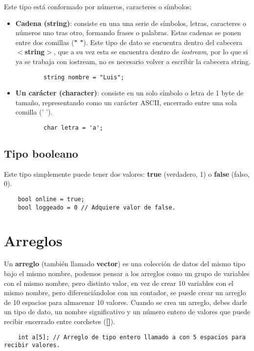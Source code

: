Este tipo está conformado por números, caracteres o símbolos:
\begin{itemize}
    \item \textbf{Cadena (string)}: consiste en una una serie de símbolos, letras, caracteres o números uno tras otro, formando frases o palabras. Estas cadenas se ponen entre dos comillas (\textbf{" "}). Este tipo de dato se encuentra dentro del cabecera \textbf{$<$string$>$}, que a su vez esta se encuentra dentro de \textit{iostream}, por lo que si ya se trabaja con iostream, no es necesario volver a escribir la cabecera string.
    \begin{lstlisting}
        string nombre = "Luis";
    \end{lstlisting}
    \item \textbf{Un carácter (character)}: consiste en un solo símbolo o letra de 1 byte de tamaño, representando como un carácter ASCII, encerrado entre una sola comilla (' ').
    \begin{lstlisting}
        char letra = 'a';
    \end{lstlisting}
\end{itemize}


\subsection{Tipo booleano}

Este tipo simplemente puede tener dos valores: \textbf{true} (verdadero, 1) o \textbf{false} (falso, 0).
\begin{lstlisting}
    bool online = true;
    bool loggeado = 0 // Adquiere valor de false.
\end{lstlisting}



\section{Arreglos}

Un \textbf{arreglo} (también llamado \textbf{vector}) es una colección de datos del mismo tipo bajo el mismo nombre, podemos pensar a los arreglos como un grupo de variables con el mismo nombre, pero distinto valor, en vez de crear 10 variables con el mismo nombre, pero diferenciándolos con un contador, se puede crear un arreglo de 10 espacios para almacenar 10 valores. Cuando se crea un arreglo, debes darle un tipo de dato, un nombre significativo y un número entero de valores que puede recibir encerrado entre corchetes (\textbf{[]}).
\begin{lstlisting}
    int a[5]; // Arreglo de tipo entero llamado a con 5 espacios para recibir valores.
\end{lstlisting}

